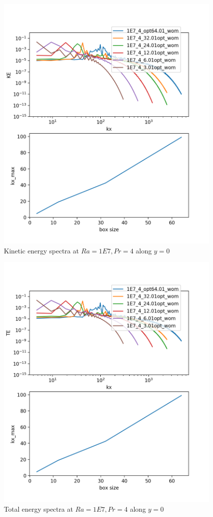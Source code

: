 \documentclass[12pt]{article}
\begin{document}
\begin{figure}[!htb]
	\includegraphics[width=\linewidth]{KE_1E7_4.png}
	\caption{ Kinetic energy spectra at $Ra = 1E7, Pr =4$ along $y = 0$}
	\label{fig:fig14}
\end{figure}

\begin{figure}[!htb]
	\includegraphics[width=\linewidth]{TE_1E7_4.png}
	\caption{ Total energy spectra at $Ra = 1E7, Pr =4$ along $y = 0$}
	\label{fig:fig15}
\end{figure}
\end{document}
